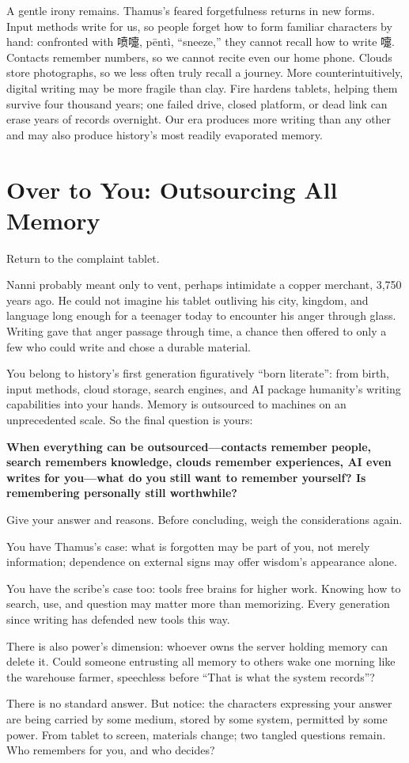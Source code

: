 A gentle irony remains. Thamus's feared forgetfulness returns in new forms. Input methods write for us, so people forget how to form familiar characters by hand: confronted with \mbox{喷嚏}, pēntì, ``sneeze,'' they cannot recall how to write \mbox{嚏}. Contacts remember numbers, so we cannot recite even our home phone. Clouds store photographs, so we less often truly recall a journey. More counterintuitively, digital writing may be more fragile than clay. Fire hardens tablets, helping them survive four thousand years; one failed drive, closed platform, or dead link can erase years of records overnight. Our era produces more writing than any other and may also produce history's most readily evaporated memory.

\section{Over to You: Outsourcing All Memory}
Return to the complaint tablet.

Nanni probably meant only to vent, perhaps intimidate a copper merchant, 3,750 years ago. He could not imagine his tablet outliving his city, kingdom, and language long enough for a teenager today to encounter his anger through glass. Writing gave that anger passage through time, a chance then offered to only a few who could write and chose a durable material.

You belong to history's first generation figuratively ``born literate'': from birth, input methods, cloud storage, search engines, and AI package humanity's writing capabilities into your hands. Memory is outsourced to machines on an unprecedented scale. So the final question is yours:

\textbf{When everything can be outsourced---contacts remember people, search remembers knowledge, clouds remember experiences, AI even writes for you---what do you still want to remember yourself? Is remembering personally still worthwhile?}

Give your answer and reasons. Before concluding, weigh the considerations again.

You have Thamus's case: what is forgotten may be part of you, not merely information; dependence on external signs may offer wisdom's appearance alone.

You have the scribe's case too: tools free brains for higher work. Knowing how to search, use, and question may matter more than memorizing. Every generation since writing has defended new tools this way.

There is also power's dimension: whoever owns the server holding memory can delete it. Could someone entrusting all memory to others wake one morning like the warehouse farmer, speechless before ``That is what the system records''?

There is no standard answer. But notice: the characters expressing your answer are being carried by some medium, stored by some system, permitted by some power. From tablet to screen, materials change; two tangled questions remain. Who remembers for you, and who decides?
